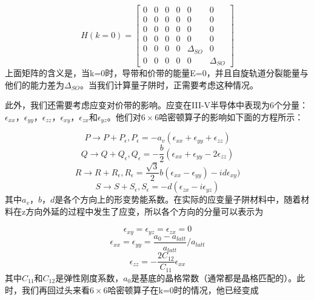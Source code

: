 \documentclass[oneside]{ZJUthesis}
\begin{document}
\begin{equation}
    H(k=0) = \left[\begin{array}{cccccc}0 & 0 & 0 & 0 & 0 & 0 \\0 & 0 & 0 & 0 & 0 & 0 \\0 & 0 & 0 & 0 & 0 & 0 \\0 & 0 & 0 & 0 & 0 & 0 \\0 & 0 & 0 & 0 & \Delta_{SO} & 0 \\0 & 0 & 0 & 0 & 0 & \Delta_{SO}\end{array}\right]
\end{equation}
上面矩阵的含义是，当k=0时，导带和价带的能量E=0，并且自旋轨道分裂能量与他们的能力差为$\Delta_{SO}$。当我们计算量子阱时，正需要考虑这种情况。

此外，我们还需要考虑应变对价带的影响。应变在III-V半导体中表现为6个分量：$\epsilon_{xx}$，$\epsilon_{yy}$，$\epsilon_{zz}$，$\epsilon_{xy}$，$\epsilon_{zx}$和$\epsilon_{yz}$。他们对$6\times6$哈密顿算子的影响如下面的方程所示\cite{Calvin1992Spin}：

\begin{equation}
    P \rightarrow P + P_{\epsilon} ,  P_{\epsilon} = - a_v (\epsilon_{xx} + \epsilon_{yy} + \epsilon_{zz})
\end{equation}
\begin{equation}
    Q \rightarrow Q + Q_{\epsilon} ,  Q_{\epsilon} = - \frac{b}{2} (\epsilon_{xx} + \epsilon_{yy} -2 \epsilon_{zz})
\end{equation}
\begin{equation}
    R \rightarrow R + R_{\epsilon} ,  R_{\epsilon} = \frac{\sqrt{3}}{2} b (\epsilon_{xx} - \epsilon_{yy}) - i d \epsilon_{xy})
\end{equation}
\begin{equation}
    S \rightarrow S + S_{\epsilon} ,  S_{\epsilon} = - d (\epsilon_{zx} -i \epsilon_{yz})
\end{equation}
其中$a_v$，$b$，$d$是各个方向上的形变势能系数。在实际的应变量子阱材料中，随着材料在z方向外延的过程中发生了应变，所以各个方向的分量可以表示为

\begin{equation}
    \epsilon_{xy} = \epsilon_{yz} = \epsilon_{zx} = 0
\end{equation}
\begin{equation}
    \epsilon_{xx} = \epsilon_{yy} = \frac{a_0 - a_{latt}}{a_{latt}} / a_{latt}
\end{equation}
\begin{equation}
    \epsilon_{zz} = - \frac{2 C_{12}}{C_{11}}  \epsilon_{xx}
\end{equation}
其中$C_{11}$和$C_{12}$是弹性刚度系数，$a_0$是基底的晶格常数（通常都是晶格匹配的）。此时，我们再回过头来看$6\times6$哈密顿算子在k=0时的情况，他已经变成
\end{document}
